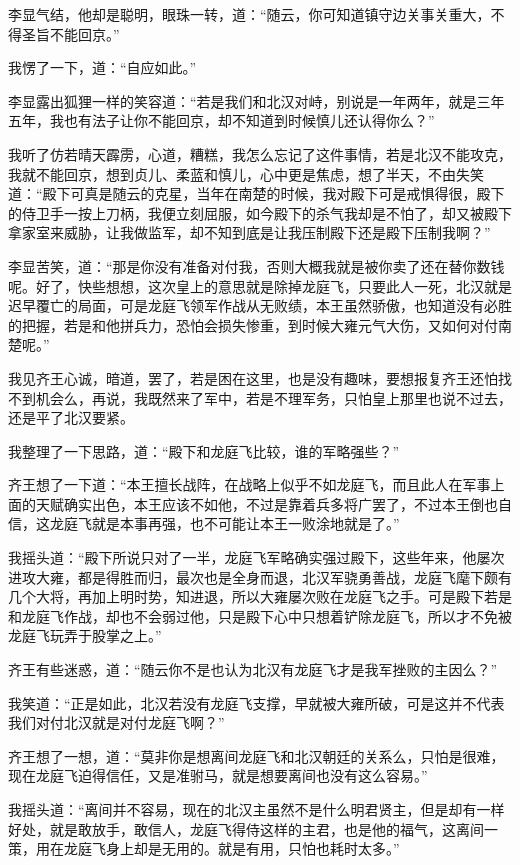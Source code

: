 李显气结，他却是聪明，眼珠一转，道：“随云，你可知道镇守边关事关重大，不得圣旨不能回京。”

我愣了一下，道：“自应如此。”

李显露出狐狸一样的笑容道：“若是我们和北汉对峙，别说是一年两年，就是三年五年，我也有法子让你不能回京，却不知道到时候慎儿还认得你么？”

我听了仿若晴天霹雳，心道，糟糕，我怎么忘记了这件事情，若是北汉不能攻克，我就不能回京，想到贞儿、柔蓝和慎儿，心中更是焦虑，想了半天，不由失笑道：“殿下可真是随云的克星，当年在南楚的时候，我对殿下可是戒惧得很，殿下的侍卫手一按上刀柄，我便立刻屈服，如今殿下的杀气我却是不怕了，却又被殿下拿家室来威胁，让我做监军，却不知到底是让我压制殿下还是殿下压制我啊？”

李显苦笑，道：“那是你没有准备对付我，否则大概我就是被你卖了还在替你数钱呢。好了，快些想想，这次皇上的意思就是除掉龙庭飞，只要此人一死，北汉就是迟早覆亡的局面，可是龙庭飞领军作战从无败绩，本王虽然骄傲，也知道没有必胜的把握，若是和他拼兵力，恐怕会损失惨重，到时候大雍元气大伤，又如何对付南楚呢。”

我见齐王心诚，暗道，罢了，若是困在这里，也是没有趣味，要想报复齐王还怕找不到机会么，再说，我既然来了军中，若是不理军务，只怕皇上那里也说不过去，还是平了北汉要紧。

我整理了一下思路，道：“殿下和龙庭飞比较，谁的军略强些？”

齐王想了一下道：“本王擅长战阵，在战略上似乎不如龙庭飞，而且此人在军事上面的天赋确实出色，本王应该不如他，不过是靠着兵多将广罢了，不过本王倒也自信，这龙庭飞就是本事再强，也不可能让本王一败涂地就是了。”

我摇头道：“殿下所说只对了一半，龙庭飞军略确实强过殿下，这些年来，他屡次进攻大雍，都是得胜而归，最次也是全身而退，北汉军骁勇善战，龙庭飞麾下颇有几个大将，再加上明时势，知进退，所以大雍屡次败在龙庭飞之手。可是殿下若是和龙庭飞作战，却也不会弱过他，只是殿下心中只想着铲除龙庭飞，所以才不免被龙庭飞玩弄于股掌之上。”

齐王有些迷惑，道：“随云你不是也认为北汉有龙庭飞才是我军挫败的主因么？”

我笑道：“正是如此，北汉若没有龙庭飞支撑，早就被大雍所破，可是这并不代表我们对付北汉就是对付龙庭飞啊？”

齐王想了一想，道：“莫非你是想离间龙庭飞和北汉朝廷的关系么，只怕是很难，现在龙庭飞迫得信任，又是准驸马，就是想要离间也没有这么容易。”

我摇头道：“离间并不容易，现在的北汉主虽然不是什么明君贤主，但是却有一样好处，就是敢放手，敢信人，龙庭飞得侍这样的主君，也是他的福气，这离间一策，用在龙庭飞身上却是无用的。就是有用，只怕也耗时太多。”

